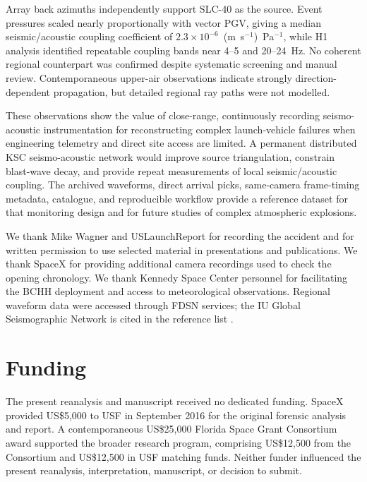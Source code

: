 \documentclass[]{seismica}
\begin{document}
Array back azimuths independently support SLC-40 as the source. Event
pressures scaled nearly proportionally with vector PGV, giving a median
seismic/acoustic coupling coefficient of
$2.3\times10^{-6}$~(m~s$^{-1}$)~Pa$^{-1}$, while H1 analysis identified
repeatable coupling bands near 4--5 and 20--24~Hz. No coherent regional
counterpart was confirmed despite systematic screening and manual review.
Contemporaneous upper-air observations indicate strongly direction-dependent
propagation, but detailed regional ray paths were not modelled.

These observations show the value of close-range, continuously recording
seismo-acoustic instrumentation for reconstructing complex launch-vehicle
failures when engineering telemetry and direct site access are limited. A
permanent distributed KSC seismo-acoustic network would improve source
triangulation, constrain blast-wave decay, and provide repeat measurements of
local seismic/acoustic coupling. The archived waveforms, direct arrival picks,
same-camera frame-timing metadata, catalogue, and reproducible workflow provide
a reference dataset for that monitoring design and for future studies of
complex atmospheric explosions.

\begin{acknowledgements}
We thank Mike Wagner and USLaunchReport for recording the accident and for
written permission to use selected material in presentations and publications.
We thank SpaceX for providing additional camera recordings used to check the
opening chronology.
We thank Kennedy Space Center personnel for facilitating the BCHH deployment
and access to meteorological observations. Regional waveform data were
accessed through FDSN services; the IU Global Seismographic Network is cited
in the reference list \citep{asl_gsn_iu_1988}.
\end{acknowledgements}


\section*{Funding}

The present reanalysis and manuscript received no dedicated funding. SpaceX
provided US\$5,000 to USF in September 2016 for the original forensic analysis
and report. A contemporaneous US\$25,000 Florida Space Grant Consortium award
supported the broader research program, comprising US\$12,500 from the
Consortium and US\$12,500 in USF matching funds. Neither funder influenced the
present reanalysis, interpretation, manuscript, or decision to submit.
\end{document}
